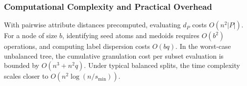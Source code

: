 \subsubsection{Computational Complexity and Practical Overhead}
With pairwise attribute distances precomputed, evaluating $d_P$ costs $O(n^2 |P|)$. For a node of size $b$, identifying seed atoms and medoids requires $O(b^2)$ operations, and computing label dispersion costs $O(bq)$. In the worst-case unbalanced tree, the cumulative granulation cost per subset evaluation is bounded by $O(n^3 + n^2 q)$. Under typical balanced splits, the time complexity scales closer to $O(n^2 \log(n/s_{\min}))$.